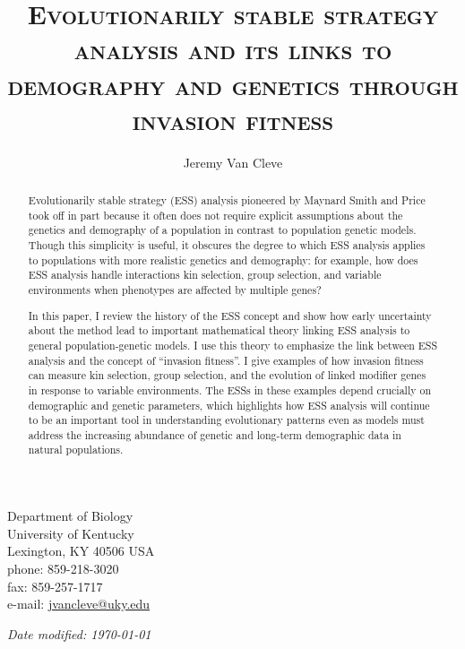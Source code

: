 \documentclass[11pt]{article}
\begin{document}
\begin{titlingpage}
\setlength{\droptitle}{2em}
\pretitle{\begin{center}\LARGE}
\posttitle{\par\end{center}\vskip 2.5em}

\title{\scshape Evolutionarily stable strategy analysis and its links to demography and genetics through invasion fitness}
\author{Jeremy Van Cleve}
\date{}
\maketitle

\vfill

\noindent
Department of Biology\\
University of Kentucky\\
Lexington, KY 40506 USA\\[1em]
phone: 859-218-3020\\
fax: 859-257-1717\\[1em]
e-mail: \href{mailto:jvancleve@uky.edu}{jvancleve@uky.edu}

\vspace{2em}

\begin{flushright} \textit{Date modified: \today} \end{flushright}
\end{titlingpage}

\linenumbers
\onehalfspacing
\begin{abstract}

  Evolutionarily stable strategy (ESS) analysis pioneered by Maynard Smith and Price took off in part because it often does not require explicit assumptions about the genetics and demography of a population in contrast to population genetic models. Though this simplicity is useful, it obscures the degree to which ESS analysis applies to populations with more realistic genetics and demography: for example, how does ESS analysis handle interactions kin selection, group selection, and variable environments when phenotypes are affected by multiple genes?

  In this paper, I review the history of the ESS concept and show how early uncertainty about the method lead to important mathematical theory linking ESS analysis to general population-genetic models. I use this theory to emphasize the link between ESS analysis and the concept of ``invasion fitness''. I give examples of how invasion fitness can measure kin selection, group selection, and the evolution of linked modifier genes in response to variable environments. The ESSs in these examples depend crucially on demographic and genetic parameters, which highlights how ESS analysis will continue to be an important tool in understanding evolutionary patterns even as models must address the increasing abundance of genetic and long-term demographic data in natural populations.

\end{abstract}
\end{document}
